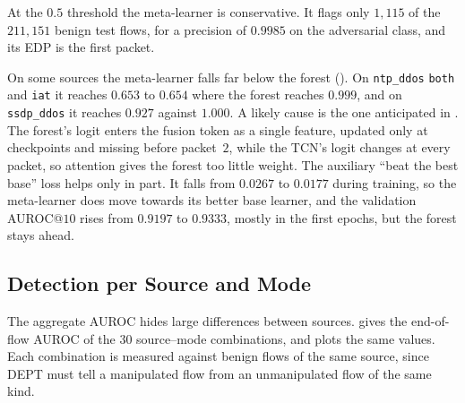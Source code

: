 At the $0.5$ threshold the meta-learner is conservative. It flags only $1{,}115$ of the
$211{,}151$ benign test flows, for a precision of $0.9985$ on the adversarial class, and
its \ac{EDP} is the first packet.

On some sources the meta-learner falls far below the forest
(). On \texttt{ntp\_ddos} \texttt{both} and \texttt{iat} it
reaches $0.653$ to $0.654$ where the forest reaches $0.999$, and on \texttt{ssdp\_ddos} it
reaches $0.927$ against $1.000$. A likely cause is the one anticipated in
. The forest's logit enters the fusion token as a single feature,
updated only at checkpoints and missing before packet~$2$, while the \ac{TCN}'s logit
changes at every packet, so attention gives the forest too little weight. The auxiliary
``beat the best base'' loss helps only in part. It falls from $0.0267$ to $0.0177$ during
training, so the meta-learner does move towards its better base learner, and the
validation AUROC@$10$ rises from $0.9197$ to $0.9333$, mostly in the first epochs, but
the forest stays ahead.

\subsection{Detection per Source and Mode}\label{subsec:eval-persource}

The aggregate AUROC hides large differences between sources. 
gives the end-of-flow AUROC of the $30$ source--mode combinations, and
 plots the same values. Each combination is measured against
benign flows of the same source, since DEPT must tell a manipulated flow from an
unmanipulated flow of the same kind.

